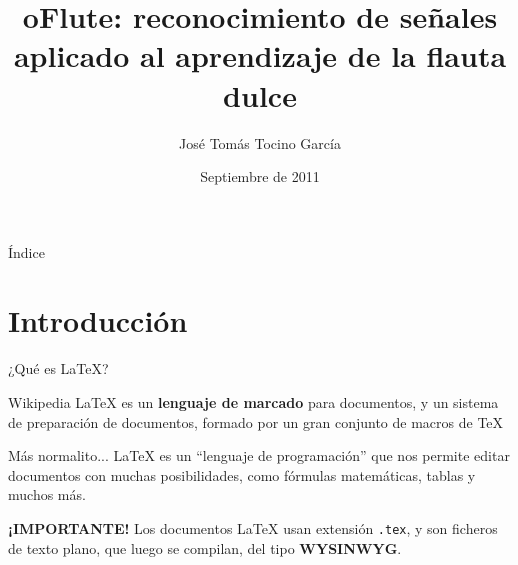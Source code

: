 \documentclass[9pt,xcolor=svgnames]{beamer}
\title{oFlute: reconocimiento de señales aplicado al aprendizaje de la flauta
  dulce}
\author{José Tomás Tocino García}
\institute[Universidad de Cádiz]{Universidad de Cádiz}
\date[Sept 2011]{Septiembre de 2011}
\begin{document}
{
\begin{frame}
  \titlepage
\end{frame}
}
\normalsize


\begin{frame}{Índice}
 \tableofcontents
\end{frame}
  

\section{Introducción}

\begin{frame}{¿Qué es \LaTeX?}
  \begin{block}{Wikipedia}
    \noindent \LaTeX{} es un \textbf{lenguaje de marcado} para
    documentos, y un sistema de preparación de documentos, formado
    por un gran conjunto de macros de \TeX{}
  \end{block}

  \pause

  \begin{block}{Más normalito...}
    \noindent \LaTeX{} es un ``lenguaje de programación'' que nos
    permite editar documentos con muchas posibilidades, como fórmulas
    matemáticas, tablas y muchos más.
  \end{block}

  \pause
  
  \begin{block}{\textbf{¡IMPORTANTE!}}
    \noindent Los documentos \LaTeX{} usan extensión \texttt{.tex}, y
    son ficheros de texto plano, que luego se compilan, del tipo
    \textbf{WYSINWYG}.
  \end{block}
  
\end{frame}
\end{document}
